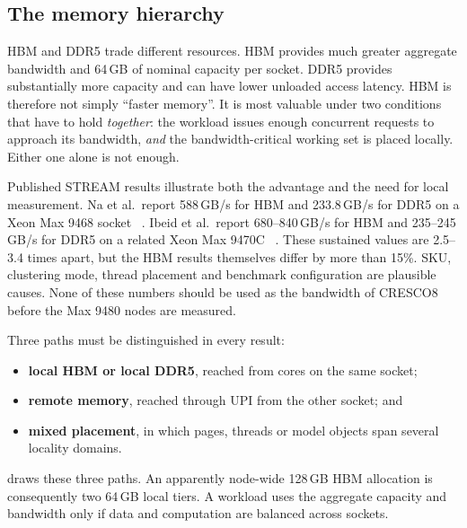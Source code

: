 \subsection{The memory hierarchy}
\label{sec:memory-hierarchy}

HBM and DDR5 trade different resources.  HBM provides much greater
aggregate bandwidth and 64\,GB of nominal capacity per socket.  DDR5
provides substantially more capacity and can have lower unloaded access
latency.  HBM is therefore not simply ``faster memory''.  It is most valuable
under two conditions that have to hold \emph{together}: the workload
issues enough concurrent requests to approach its bandwidth, \emph{and}
the bandwidth-critical working set is placed locally.  Either one alone
is not enough.

Published STREAM results illustrate both the advantage and the need for
local measurement.  Na et al.\ report 588\,GB/s for HBM and
233.8\,GB/s for DDR5 on a Xeon Max 9468 socket
~\cite{na2024llmcpu}.  Ibeid et al.\ report 680--840\,GB/s for HBM and
235--245\,GB/s for DDR5 on a related Xeon Max 9470C
~\cite{ibeid2025aurora}.  These sustained values are 2.5--3.4 times
apart, but the HBM results themselves differ by more than 15\%.  SKU,
clustering mode, thread placement and benchmark configuration are
plausible causes.  None of these numbers should be used as the bandwidth
of CRESCO8 before the Max 9480 nodes are measured.

Three paths must be distinguished in every result:

\begin{itemize}
  \item \textbf{local HBM or local DDR5}, reached from cores on the same
        socket;
  \item \textbf{remote memory}, reached through UPI from the other
        socket; and
  \item \textbf{mixed placement}, in which pages, threads or model
        objects span several locality domains.
\end{itemize}

 draws these three paths.  An apparently
node-wide 128\,GB HBM allocation is consequently two 64\,GB local
tiers.  A workload uses the aggregate capacity and
bandwidth only if data and computation are balanced across sockets.

